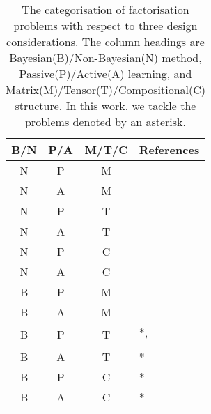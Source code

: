 
\begin{table}[t]
\centering
\caption{\label{tbl:relatedwork}The categorisation of factorisation problems with respect to 
three design considerations. The column headings are Bayesian(B)/Non-Bayesian(N) method, Passive(P)/Active(A) learning, and Matrix(M)/Tensor(T)/Compositional(C) structure. In this work, we tackle the problems denoted by an asterisk.}
\vskip 0.15in
\begin{tabular}{c c c l}
B/N & P/A & M/T/C & References	\\ \hline \hline

N & P & M & \citet{lee1999learning}\\ \hline
N & A & M & \citet{ruchansky2015matrix}\\  \hline

\multirow{2}{*}{N} & \multirow{2}{*}{P} & \multirow{2}{*}{T}& \citet{nickel2011three}\\
& & & \citet{kolda2009tensor}\\ \hline
N & A & T & \citet{kajino2015active} \\  \hline

\multirow{2}{*}{N} & \multirow{2}{*}{P} & \multirow{2}{*}{C} & \citet{Neelakantan2015} \\ 
& & & \citet{guu2015traversing}\\ \hline

N & A & C & -- \\ \hline

B & P & M & \citet{mnih2007probabilistic}\\ \hline

\multirow{2}{*}{B} & \multirow{2}{*}{A} & \multirow{2}{*}{M}&  \citet{kawale2015efficient} \\
& & & \citet{sutherland2013active}\\ \hline

\multirow{2}{*}{B} & \multirow{2}{*}{P} & \multirow{2}{*}{T}& *, \citet{xiong2010temporal}\\
& & & \citet{schmidt2009probabilistic} \\ \hline

B & A & T & * \\ \hline

B & P & C & * \\ \hline

B & A & C & * \\ 
\end{tabular}
\end{table}
